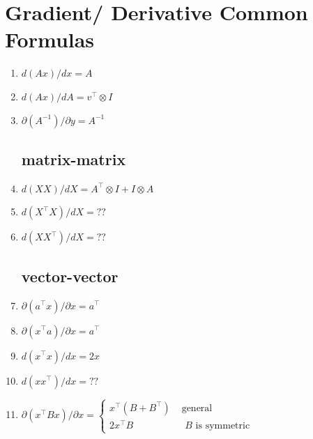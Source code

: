\section{Gradient/ Derivative Common Formulas}\label{matrix-vector: Gradient/ Derivative Common Formulas}

\begin{enumerate}
    \subsection{Matrix-vector}
    
    \item \( d(Ax)/dx = A \)

    \item $d(Ax)/dA = v^\top\otimes I $
    
    \item \( \partial (A^{-1})/\partial y = A^{-1}\)

    \subsection{matrix-matrix}
    \item \(
        d(XX)/dX = A^\top \otimes I+I\otimes A
    \)
    
    \item  $d(X^\top X)/dX = ??$
    
    \item  $d(XX^\top )/dX = ??$

    \subsection{vector-vector}
    \item  $\partial (a^\top x)/\partial x = a^\top$

    \item $\partial (x^\top a)/\partial x = a^\top$

    \item  $d(x^\top x)/dx = 2x$

    \item  $d(xx^\top)/dx = ??$

    \item  \(
        \partial (x^\top Bx)/\partial x = \begin{cases}
            x^\top(B + B^\top) & \text{ general}\\
            2x^\top B & \text{ $B$ is symmetric}
        \end{cases}
    \)


\end{enumerate}
